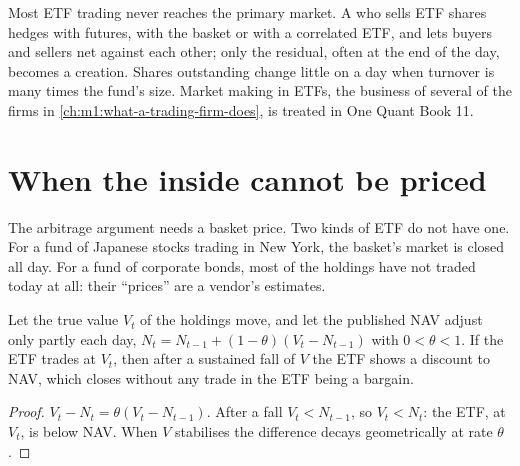 \begin{omfigure}

\label{fig:m1:exchange-traded-funds:premium}
\end{omfigure}

Most ETF trading never reaches the primary market. A  who sells
ETF shares hedges with futures, with the basket or with a correlated ETF, and
lets buyers and sellers net against each other; only the residual, often at
the end of the day, becomes a creation. Shares outstanding change little on a
day when turnover is many times the fund's size. Market making in ETFs, the
business of several of the firms in \cref{ch:m1:what-a-trading-firm-does}, is
treated in One Quant Book 11.

\section{When the inside cannot be priced}

The arbitrage argument needs a basket price. Two kinds of ETF do not have
one. For a fund of Japanese stocks trading in New York, the basket's market
is closed all day. For a fund of corporate bonds, most of the holdings have
not traded today at all: their ``prices'' are a vendor's estimates.

\begin{proposition}\label{prop:m1:exchange-traded-funds:stale}
Let the true value $V_t$ of the holdings move, and let the published NAV
adjust only partly each day, $N_t = N_{t-1} + (1-\theta)(V_t - N_{t-1})$ with
$0 < \theta < 1$. If the ETF trades at $V_t$, then after a sustained fall of
$V$ the ETF shows a discount to NAV, which closes without any trade in the
ETF being a bargain.
\end{proposition}
\begin{proof}
$V_t - N_t = \theta(V_t - N_{t-1})$. After a fall $V_t < N_{t-1}$, so $V_t <
N_t$: the ETF, at $V_t$, is below NAV. When $V$ stabilises the difference
decays geometrically at rate $\theta$.
\end{proof}

